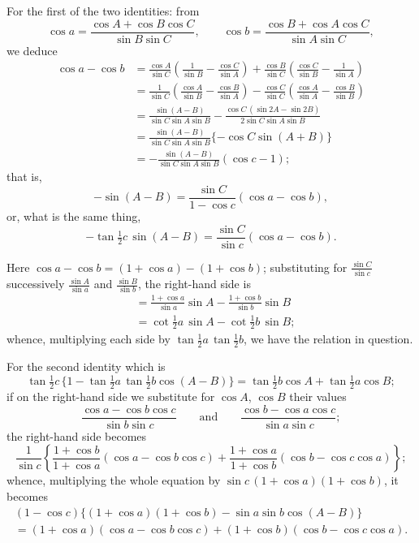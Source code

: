 \documentclass[12pt,a4paper]{article}
\theoremstyle{plain}
\begin{document}
For the first of the two identities: from
\[
\cos a = \frac{\cos A + \cos B\cos C}{\sin B\sin C},\qquad
\cos b = \frac{\cos B + \cos A\cos C}{\sin A\sin C},
\]
we deduce
\begin{align*}
\cos a - \cos b
&= \frac{\cos A}{\sin C}\left(\frac{1}{\sin B}-\frac{\cos C}{\sin A}\right)
+ \frac{\cos B}{\sin C}\left(\frac{\cos C}{\sin B}-\frac{1}{\sin A}\right)\\
&= \frac{1}{\sin C}
\left(\frac{\cos A}{\sin B}-\frac{\cos B}{\sin A}\right)
- \frac{\cos C}{\sin C}
\left(\frac{\cos A}{\sin A}-\frac{\cos B}{\sin B}\right)\\
&= \frac{\sin(A-B)}{\sin C\sin A\sin B}
- \frac{\cos C\,(\sin 2A - \sin 2B)}{2\sin C\sin A\sin B}\\
&= \frac{\sin(A-B)}{\sin C\sin A\sin B}
\{-\cos C\sin(A+B)\}\\
&= -\frac{\sin(A-B)}{\sin C\sin A\sin B}(\cos c - 1);
\end{align*}
that is,
\[
-\sin(A-B) = \frac{\sin C}{1-\cos c}(\cos a - \cos b),
\]
or, what is the same thing,
\[
-\tan\tfrac{1}{2}c\,\sin(A-B) = \frac{\sin C}{\sin c}(\cos a - \cos b).
\]

Here $\cos a - \cos b = (1+\cos a) - (1+\cos b)$; substituting for
$\frac{\sin C}{\sin c}$ successively $\frac{\sin A}{\sin a}$ and $\frac{\sin B}{\sin b}$, the right-hand side is
\begin{align*}
&= \frac{1+\cos a}{\sin a}\sin A - \frac{1+\cos b}{\sin b}\sin B\\
&= \cot\tfrac{1}{2}a\,\sin A - \cot\tfrac{1}{2}b\,\sin B;
\end{align*}
whence, multiplying each side by $\tan\tfrac{1}{2}a\,\tan\tfrac{1}{2}b$, we have the
relation in question.

For the second identity which is
\[
\tan\tfrac{1}{2}c\,\{1-\tan\tfrac{1}{2}a\,\tan\tfrac{1}{2}b\cos(A-B)\}
= \tan\tfrac{1}{2}b\cos A + \tan\tfrac{1}{2}a\cos B;
\]
if on the right-hand side we substitute for $\cos A$, $\cos B$ their values
\[
\frac{\cos a - \cos b\cos c}{\sin b\sin c}\qquad\text{and}\qquad
\frac{\cos b - \cos a\cos c}{\sin a\sin c};
\]
the right-hand side becomes
\[
\frac{1}{\sin c}
\left\{\frac{1+\cos b}{1+\cos a}(\cos a - \cos b\cos c)
+ \frac{1+\cos a}{1+\cos b}(\cos b - \cos c\cos a)\right\};
\]
whence, multiplying the whole equation by
$\sin c\,(1+\cos a)(1+\cos b)$, it becomes
\begin{multline*}
(1-\cos c)\{(1+\cos a)(1+\cos b) - \sin a\sin b\cos(A-B)\}\\
= (1+\cos a)(\cos a - \cos b\cos c) + (1+\cos b)(\cos b - \cos c\cos a).
\end{multline*}
\end{document}
